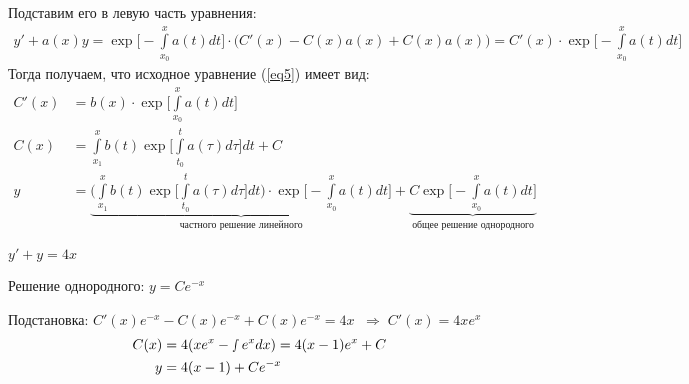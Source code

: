 Подставим его в левую часть уравнения:
\begin{align*}
    y' + a(x)y = \exp{\Big[-\int\limits_{x_0}^xa(t)dt\Big]}\cdot \Big(C'(x) - C(x)a(x) + C(x)a(x)\Big) 
    = C'(x)\cdot \exp{\Big[-\int\limits_{x_0}^xa(t)dt\Big]}
\end{align*}
Тогда получаем, что исходное уравнение (\ref{eq5}) имеет вид:
\begin{align*}
    C'(x) &= b(x) \cdot \exp{\Big[\int\limits_{x_0}^xa(t)dt\Big]}\\
    C(x) &= \int\limits_{x_1}^{x}b(t)\exp{\Big[\int\limits_{t_0}^ta(\tau)d\tau\Big]}dt + C \\
    y &= \underbrace{\Big(\int\limits_{x_1}^{x}b(t)\exp{\Big[\int\limits_{t_0}^ta(\tau)d\tau\Big]}dt\Big)\cdot \exp{\Big[-\int\limits_{x_0}^xa(t)dt\Big]}}_{\text{частного решение линейного}} + \underbrace{C\exp{\Big[-\int\limits_{x_0}^xa(t)dt\Big]}}_{\text{общее решение однородного}}
\end{align*}

\Example $y' + y = 4x$

Решение однородного: $y = Ce^{-x}$

Подстановка: $C'(x)e^{-x} - C(x)e^{-x} + C(x)e^{-x} = 4x \;\; \Rightarrow \; C'(x) = 4xe^{x}$
\begin{align*}
    C(x) &= 4(xe^x - \smallint e^xdx) = 4(x-1)e^x + C \\
    y &= 4(x-1) + Ce^{-x}
\end{align*}
